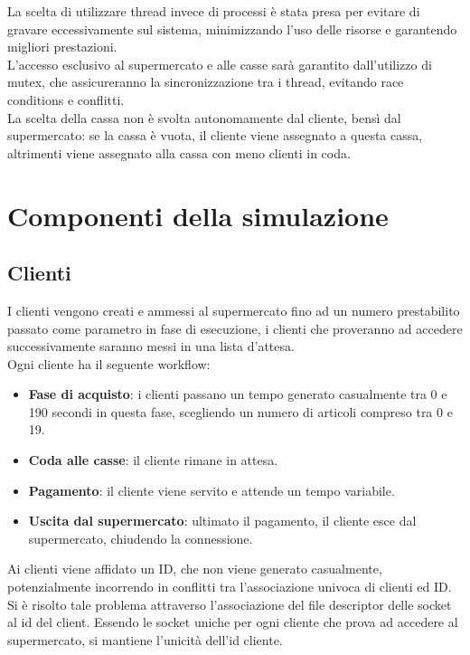 \documentclass[a4paper, 12pt]{article}
\begin{document}
La scelta di utilizzare thread invece di processi è stata presa per evitare di
gravare eccessivamente sul sistema, minimizzando l'uso delle risorse e garantendo
migliori prestazioni. \\
L'accesso esclusivo al supermercato e alle casse sarà garantito dall'utilizzo di 
mutex, che assicureranno la sincronizzazione tra i thread, evitando race conditions
e conflitti. \\
La scelta della cassa non è svolta autonomamente dal cliente, bensì dal supermercato:
se la cassa è vuota, il cliente viene assegnato a questa cassa, altrimenti viene
assegnato alla cassa con meno clienti in coda.

\section{Componenti della simulazione}

\subsection{Clienti}
I clienti vengono creati e ammessi al supermercato fino ad un numero prestabilito
passato come parametro in fase di esecuzione, i clienti che proveranno ad accedere
successivamente saranno messi in una lista d'attesa. \\
Ogni cliente ha il seguente workflow:

\begin{itemize}[noitemsep,topsep=0pt,parsep=0pt,partopsep=0pt]
    \item \textbf{Fase di acquisto}: i clienti passano un tempo generato casualmente
        tra 0 e 190 secondi in questa fase, scegliendo un numero di articoli compreso
        tra 0 e 19.
    \item \textbf{Coda alle casse}: il cliente rimane in attesa.
    \item \textbf{Pagamento}: il cliente viene servito e attende un tempo
        variabile.
    \item \textbf{Uscita dal supermercato}: ultimato il pagamento, il cliente esce dal
        supermercato, chiudendo la connessione.

\end{itemize}

Ai clienti viene affidato un ID, che non viene generato casualmente, potenzialmente incorrendo in conflitti tra l'associazione univoca di clienti ed ID. Si è risolto tale problema attraverso l'associazione del file  descriptor delle socket al id del client. Essendo le socket uniche per ogni cliente che prova ad accedere al supermercato, si mantiene l'unicità dell'id cliente.
\end{document}
